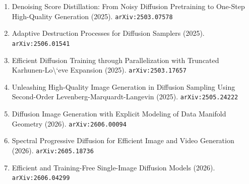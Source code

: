 \documentclass[11pt]{article}
\begin{document}
\begin{enumerate}
  \item Denoising Score Distillation: From Noisy Diffusion Pretraining to One-Step High-Quality Generation (2025). \texttt{arXiv:2503.07578}
  \item Adaptive Destruction Processes for Diffusion Samplers (2025). \texttt{arXiv:2506.01541}
  \item Efficient Diffusion Training through Parallelization with Truncated Karhunen-Lo\textbackslash{}`eve Expansion (2025). \texttt{arXiv:2503.17657}
  \item Unleashing High-Quality Image Generation in Diffusion Sampling Using Second-Order Levenberg-Marquardt-Langevin (2025). \texttt{arXiv:2505.24222}
  \item Diffusion Image Generation with Explicit Modeling of Data Manifold Geometry (2026). \texttt{arXiv:2606.00094}
  \item Spectral Progressive Diffusion for Efficient Image and Video Generation (2026). \texttt{arXiv:2605.18736}
  \item Efficient and Training-Free Single-Image Diffusion Models (2026). \texttt{arXiv:2606.04299}
\end{enumerate}
\end{document}
